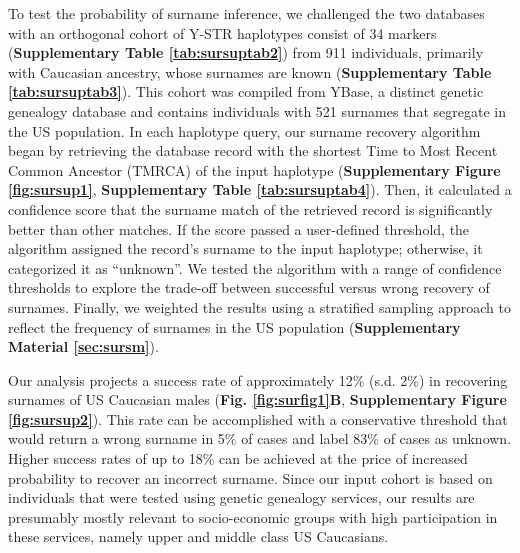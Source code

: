 To test the probability of surname inference, we challenged the two databases with an orthogonal cohort of Y-STR haplotypes consist of 34 markers (\textbf{Supplementary Table  \ref{tab:sursuptab2}}) from 911 individuals, primarily with Caucasian ancestry, whose surnames are known (\textbf{Supplementary Table  \ref{tab:sursuptab3}}). This cohort was compiled from YBase, a distinct genetic genealogy database and contains individuals with 521 surnames that segregate in the US population. In each haplotype query, our surname recovery algorithm began by retrieving the database record with the shortest Time to Most Recent Common Ancestor (TMRCA) of the input haplotype (\textbf{Supplementary Figure \ref{fig:sursup1}}, \textbf{Supplementary Table \ref{tab:sursuptab4}}). Then, it calculated a confidence score that the surname match of the retrieved record is significantly better than other matches. If the score passed a user-defined threshold, the algorithm assigned the record's surname to the input haplotype; otherwise, it categorized it as ``unknown''. We tested the algorithm with a range of confidence thresholds to explore the trade-off between successful versus wrong recovery of surnames. Finally, we weighted the results using a stratified sampling approach to reflect the frequency of surnames in the US population (\textbf{Supplementary Material \ref{sec:sursm}}). 

Our analysis projects a success rate of approximately 12\% (s.d. 2\%) in recovering surnames of US Caucasian males (\textbf{Fig. \ref{fig:surfig1}B}, \textbf{Supplementary Figure \ref{fig:sursup2}}). This rate can be accomplished with a conservative threshold that would return a wrong surname in 5\% of cases and label 83\% of cases as unknown. Higher success rates of up to 18\% can be achieved at the price of increased probability to recover an incorrect surname. Since our input cohort is based on individuals that were tested using genetic genealogy services, our results are presumably mostly relevant to socio-economic groups with high participation in these services, namely upper and middle class US Caucasians.

